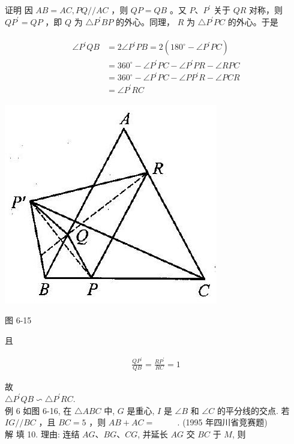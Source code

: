 \documentclass[10pt]{article}
\begin{document}
证明 因 $A B=A C, P Q / / A C$ ，则 $Q P=Q B$ 。又 $P 、 P^{\prime}$ 关于 $Q R$ 对称，则 $Q P^{\prime}=Q P$ ，即 $Q$ 为 $\triangle P^{\prime} B P$ 的外心。同理， $R$ 为 $\triangle P^{\prime} P C$ 的外心。于是

\begin{align*}
\begin{aligned}
\angle P^{\prime} Q B & =2 \angle P^{\prime} P B=2\left(180^{\circ}-\angle P^{\prime} P C\right) \\
& =360^{\circ}-\angle P^{\prime} P C-\angle P^{\prime} P R-\angle R P C \\
& =360^{\circ}-\angle P^{\prime} P C-\angle P P^{\prime} R-\angle P C R \\
& =\angle P^{\prime} R C
\end{aligned}
\end{align*}

\begin{center}
\includegraphics[max width=\textwidth]{2024_10_30_2c8f45efd4a519b08e1ag-068(2)}
\end{center}

图 6-15

且

\begin{align*}
\frac{Q P^{\prime}}{Q B}=\frac{R P^{\prime}}{R C}=1
\end{align*}

故\\
$\triangle P^{\prime} Q B \backsim \triangle P^{\prime} R C$.\\
例 6 如图 6-16, 在 $\triangle A B C$ 中, $G$ 是重心, $I$ 是 $\angle B$ 和 $\angle C$ 的平分线的交点. 若 $I G / / B C$ ，且 $B C=5$ ，则 $A B+A C=$ $\qquad$ . (1995 年四川省竞赛题)\\
解 填 10. 理由: 连结 $A G 、 B G 、 C G$, 并延长 $A G$ 交 $B C$ 于 $M$, 则
\end{document}
